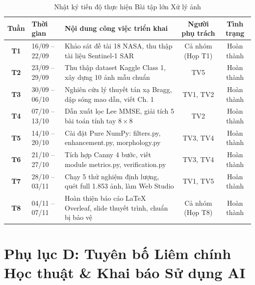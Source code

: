 \begin{table}[H]
\centering
\small
\begin{tabularx}{\textwidth}{|c|l|X|c|c|}
\hline
\textbf{Tuần} & \textbf{Thời gian} & \textbf{Nội dung công việc triển khai} & \textbf{Người phụ trách} & \textbf{Tình trạng} \\
\hline
\textbf{T1} & 16/09 -- 22/09 & Khảo sát đề tài 18 NASA, thu thập tài liệu Sentinel-1 SAR & Cả nhóm (Họp T1) & Hoàn thành \\
\hline
\textbf{T2} & 23/09 -- 29/09 & Thu thập dataset Kaggle Class 1, xây dựng 10 ảnh mẫu chuẩn & TV5 & Hoàn thành \\
\hline
\textbf{T3} & 30/09 -- 06/10 & Nghiên cứu lý thuyết tán xạ Bragg, dập sóng mao dẫn, viết Ch. 1 & TV1, TV2 & Hoàn thành \\
\hline
\textbf{T4} & 07/10 -- 13/10 & Dẫn xuất lọc Lee MMSE, giải tích 5 bài toán tính tay $8 \times 8$ & TV2 & Hoàn thành \\
\hline
\textbf{T5} & 14/10 -- 20/10 & Cài đặt Pure NumPy: filters.py, enhancement.py, morphology.py & TV3, TV4 & Hoàn thành \\
\hline
\textbf{T6} & 21/10 -- 27/10 & Tích hợp Canny 4 bước, viết module metrics.py, verification.py & TV3, TV4 & Hoàn thành \\
\hline
\textbf{T7} & 28/10 -- 03/11 & Chạy 5 thử nghiệm định lượng, quét full 1.853 ảnh, làm Web Studio & TV1, TV5 & Hoàn thành \\
\hline
\textbf{T8} & 04/11 -- 07/11 & Hoàn thiện báo cáo LaTeX Overleaf, slide thuyết trình, chuẩn bị bảo vệ & Cả nhóm (Họp T8) & Hoàn thành \\
\hline
\end{tabularx}
\caption{Nhật ký tiến độ thực hiện Bài tập lớn Xử lý ảnh}
\end{table}

\newpage
\section*{Phụ lục D: Tuyên bố Liêm chính Học thuật \& Khai báo Sử dụng AI}

